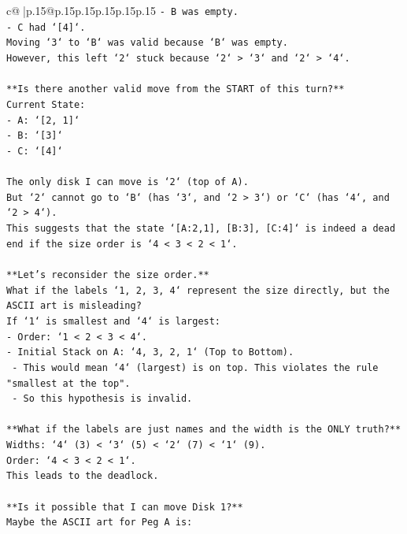 \documentclass{article}
\begin{document}
{\begin{supertabular}{c@{$\;$}|p{.15\linewidth}@{}p{.15\linewidth}p{.15\linewidth}p{.15\linewidth}p{.15\linewidth}p{.15\linewidth}}
{{{\texttt{{-} B was empty.} \\
\texttt{{-} C had `{[}4{]}`.} \\
\texttt{Moving `3` to `B` was valid because `B` was empty.} \\
\texttt{However, this left `2` stuck because `2` > `3` and `2` > `4`.} \\
\\ 
\texttt{**Is there another valid move from the START of this turn?**} \\
\texttt{Current State:} \\
\texttt{{-} A: `{[}2, 1{]}`} \\
\texttt{{-} B: `{[}3{]}`} \\
\texttt{{-} C: `{[}4{]}`} \\
\\ 
\texttt{The only disk I can move is `2` (top of A).} \\
\texttt{But `2` cannot go to `B` (has `3`, and `2 > 3`) or `C` (has `4`, and `2 > 4`).} \\
\texttt{This suggests that the state `{[}A:2,1{]}, {[}B:3{]}, {[}C:4{]}` is indeed a dead end if the size order is `4 < 3 < 2 < 1`.} \\
\\ 
\texttt{**Let's reconsider the size order.**} \\
\texttt{What if the labels `1, 2, 3, 4` represent the size directly, but the ASCII art is misleading?} \\
\texttt{If `1` is smallest and `4` is largest:} \\
\texttt{{-} Order: `1 < 2 < 3 < 4`.} \\
\texttt{{-} Initial Stack on A: `4, 3, 2, 1` (Top to Bottom).} \\
\texttt{  {-} This would mean `4` (largest) is on top. This violates the rule "smallest at the top".} \\
\texttt{  {-} So this hypothesis is invalid.} \\
\\ 
\texttt{**What if the labels are just names and the width is the ONLY truth?**} \\
\texttt{Widths: `4` (3) < `3` (5) < `2` (7) < `1` (9).} \\
\texttt{Order: `4 < 3 < 2 < 1`.} \\
\texttt{This leads to the deadlock.} \\
\\ 
\texttt{**Is it possible that I can move Disk 1?**} \\
\texttt{Maybe the ASCII art for Peg A is:} \\
}}}
\end{supertabular}}
\end{document}
